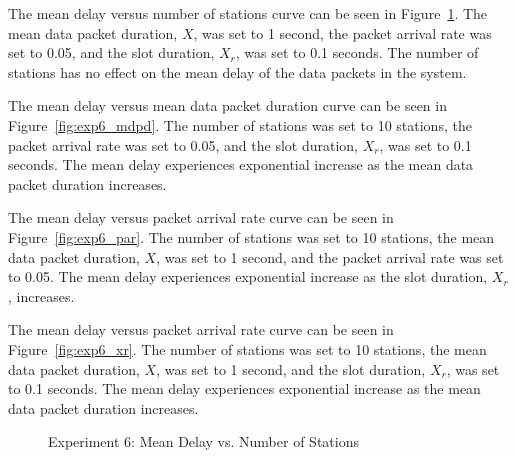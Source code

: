 The mean delay versus number of stations curve can be seen in Figure~\ref{fig:exp6_ns}. The mean data packet duration, $X$, was set to 1 second, the packet arrival rate was set to 0.05, and the slot duration, $X_r$, was set to 0.1 seconds. The number of stations has no effect on the mean delay of the data packets in the system.

The mean delay versus mean data packet duration curve can be seen in Figure~\ref{fig:exp6_mdpd}. The number of stations was set to 10 stations, the packet arrival rate was set to 0.05, and the slot duration, $X_r$, was set to 0.1 seconds. The mean delay experiences exponential increase as the mean data packet duration increases.

The mean delay versus packet arrival rate curve can be seen in Figure~\ref{fig:exp6_par}. The number of stations was set to 10 stations, the mean data packet duration, $X$, was set to 1 second, and the packet arrival rate was set to 0.05. The mean delay experiences exponential increase as the slot duration, $X_r$, increases.

The mean delay versus packet arrival rate curve can be seen in Figure~\ref{fig:exp6_xr}. The number of stations was set to 10 stations, the mean data packet duration, $X$, was set to 1 second, and the slot duration, $X_r$, was set to 0.1 seconds. The mean delay experiences exponential increase as the mean data packet duration increases.


\begin{figure}[h]
\centering
{}
\caption{Experiment 6: Mean Delay vs. Number of Stations}
\label{fig:exp6_ns}
\end{figure}

